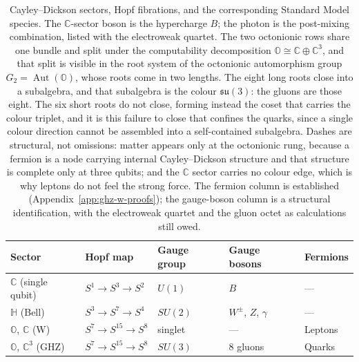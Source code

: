 \begin{table}[h]
  \centering
  \footnotesize
  \begin{tabular}{@{}lllll@{}}
    \toprule
    \textbf{Sector} & \textbf{Hopf map} & \textbf{Gauge group}
      & \textbf{Gauge bosons}\footnotemark{} & \textbf{Fermions} \\
    \midrule
    $\mathbb{C}$ (single qubit)
      & $S^{1} \to S^{3} \to S^{2}$
      & $U(1)$
      & $B$
      & --- \\
    $\mathbb{H}$ (Bell)
      & $S^{3} \to S^{7} \to S^{4}$
      & $SU(2)$
      & $W^{\pm}$, $Z$, $\gamma$
      & --- \\
    $\mathbb{O}$, $\mathbb{C}$ (W)
      & $S^{7} \to S^{15} \to S^{8}$
      & singlet
      & ---
      & Leptons \\
    $\mathbb{O}$, $\mathbb{C}^{3}$ (GHZ)
      & $S^{7} \to S^{15} \to S^{8}$
      & $SU(3)$
      & 8 gluons
      & Quarks \\
    \bottomrule
  \end{tabular}
  \ \caption{Cayley--Dickson sectors, Hopf fibrations, and the
    corresponding Standard Model species. The $\mathbb{C}$-sector boson
    is the hypercharge $B$; the photon is the post-mixing combination,
    listed with the electroweak quartet. The two octonionic rows share
    one bundle and split under the computability decomposition
    $\mathbb{O} \cong \mathbb{C} \oplus \mathbb{C}^{3}$, and that split
    is visible in the root system of the octonionic automorphism group
    $G_{2} = \operatorname{Aut}(\mathbb{O})$, whose roots come in two
    lengths. The eight long roots close into a subalgebra, and that
    subalgebra is the colour $\mathfrak{su}(3)$: the gluons are those
    eight. The six short roots do not close, forming instead the coset
    that carries the colour triplet, and it is this failure to close
    that confines the quarks, since a single colour direction cannot be
    assembled into a self-contained subalgebra. Dashes are structural,
    not omissions: matter appears only at the octonionic rung, because
    a fermion is a node carrying internal Cayley--Dickson structure and
    that structure is complete only at three qubits; and the
    $\mathbb{C}$ sector carries no colour edge, which is why leptons do
    not feel the strong force. The fermion column is established
    (Appendix~\ref{app:ghz-w-proofs}); the gauge-boson column is a
    structural identification, with the electroweak quartet and the
    gluon octet as calculations still owed.}
  \label{tab:entanglement-hopf-particles}
\end{table}

